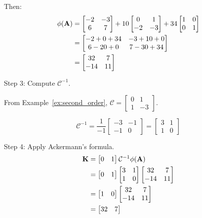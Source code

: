 \begin{example}
Then:
\begin{align}
\phi(\mathbf{A}) &= \begin{bmatrix} -2 & -3 \\ 6 & 7 \end{bmatrix} + 10\begin{bmatrix} 0 & 1 \\ -2 & -3 \end{bmatrix} + 34\begin{bmatrix} 1 & 0 \\ 0 & 1 \end{bmatrix} \\
&= \begin{bmatrix} -2+0+34 & -3+10+0 \\ 6-20+0 & 7-30+34 \end{bmatrix} \\
&= \begin{bmatrix} 32 & 7 \\ -14 & 11 \end{bmatrix}
\end{align}

Step 3: Compute $\mathcal{C}^{-1}$.

From Example~\ref{ex:second_order}, $\mathcal{C} = \begin{bmatrix} 0 & 1 \\ 1 & -3 \end{bmatrix}$.

\begin{equation}
\mathcal{C}^{-1} = \frac{1}{-1} \begin{bmatrix} -3 & -1 \\ -1 & 0 \end{bmatrix} = \begin{bmatrix} 3 & 1 \\ 1 & 0 \end{bmatrix}
\end{equation}

Step 4: Apply Ackermann's formula.
\begin{align}
\mathbf{K} &= \begin{bmatrix} 0 & 1 \end{bmatrix} \mathcal{C}^{-1} \phi(\mathbf{A}) \\
&= \begin{bmatrix} 0 & 1 \end{bmatrix} \begin{bmatrix} 3 & 1 \\ 1 & 0 \end{bmatrix} \begin{bmatrix} 32 & 7 \\ -14 & 11 \end{bmatrix} \\
&= \begin{bmatrix} 1 & 0 \end{bmatrix} \begin{bmatrix} 32 & 7 \\ -14 & 11 \end{bmatrix} \\
&= \begin{bmatrix} 32 & 7 \end{bmatrix}
\end{align}


\end{example}
